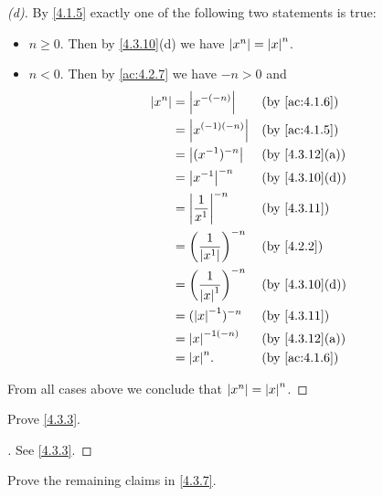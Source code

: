 \begin{proof}[(d)]
  By \cref{4.1.5} exactly one of the following two statements is true:
  \begin{itemize}
    \item \(n \geq 0\).
          Then by \cref{4.3.10}(d) we have \(\left\lvert x^n\right\rvert = \left\lvert x\right\rvert^n\).
    \item \(n < 0\).
          Then by \cref{ac:4.2.7} we have \(-n > 0\) and
          \begin{align*}
            \abs{x^n} & = \abs{x^{-(-n)}}                       &  & \by{ac:4.1.6}  \\
                      & = \abs{x^{(-1)(-n)}}                    &  & \by{ac:4.1.5}  \\
                      & = \abs{(x^{-1})^{-n}}                   &  & \by{4.3.12}[a] \\
                      & = \abs{x^{-1}}^{-n}                     &  & \by{4.3.10}[d] \\
                      & = \abs{\dfrac{1}{x^1}}^{-n}             &  & \by{4.3.11}    \\
                      & = \bigg(\dfrac{1}{\abs{x^1}}\bigg)^{-n} &  & \by{4.2.2}     \\
                      & = \bigg(\dfrac{1}{\abs{x}^1}\bigg)^{-n} &  & \by{4.3.10}[d] \\
                      & = (\abs{x}^{-1})^{-n}                   &  & \by{4.3.11}    \\
                      & = \abs{x}^{-1(-n)}                      &  & \by{4.3.12}[a] \\
                      & = \abs{x}^n.                            &  & \by{ac:4.1.6}
          \end{align*}
  \end{itemize}
  From all cases above we conclude that \(\left\lvert x^n\right\rvert = \left\lvert x\right\rvert^n\).
\end{proof}

\exercisesection

\begin{ex}\label{ex:4.3.1}
  Prove \cref{4.3.3}.
\end{ex}

\begin{proof}[]
  See \cref{4.3.3}.
\end{proof}

\begin{ex}\label{ex:4.3.2}
  Prove the remaining claims in \cref{4.3.7}.
\end{ex}

